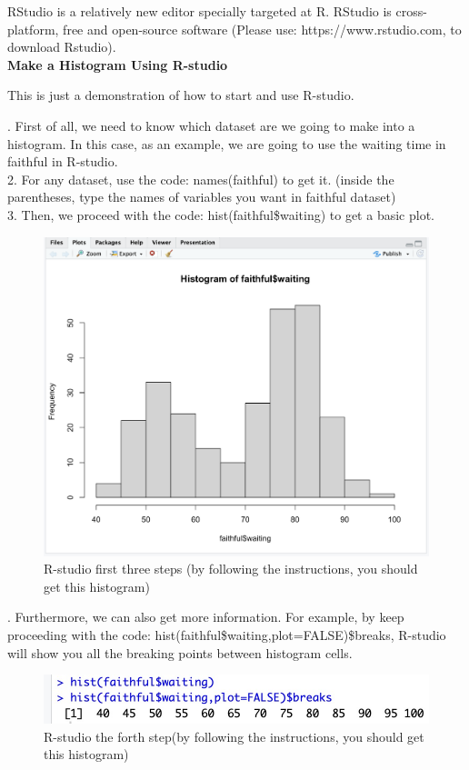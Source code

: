 \noindent
RStudio is a relatively new editor specially targeted at R. RStudio is cross-platform, free and open-source software (Please use: https://www.rstudio.com, to download Rstudio).\\

\noindent
\textbf{Make a Histogram Using R-studio}

\noindent
This is just a demonstration of how to start and use R-studio. 

. First of all, we need to know which dataset are we going to make into a histogram. In this case, as an example, we are going to use the waiting time in faithful in R-studio.\\
2. For any dataset, use the code: names(faithful) to get it. (inside the parentheses, type the names of variables you want in faithful dataset)\\
3. Then, we proceed with the code: hist(faithful\$waiting) to get a basic plot.\\

\begin{figure}[H]
 \centering
 \includegraphics[scale=0.45]{Section1/img/R1.jpg}
 \caption{R-studio first three steps (by following the instructions, you should get this histogram)}
\end{figure}

. Furthermore, we can also get more information. For example, by keep proceeding with the code: hist(faithful\$waiting,plot=FALSE)\$breaks, R-studio will show you all the breaking points between histogram cells.

\begin{figure}[H]
 \centering
 \includegraphics[scale=0.45]{Section1/img/R2.jpg}
 \caption{R-studio the forth step(by following the instructions, you should get this histogram)}
 \end{figure}
